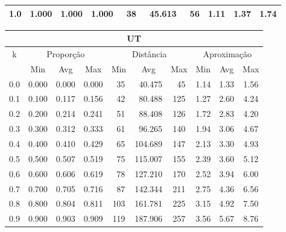 \begin{table}[!tbh]
\begin{center}
{\begin{tabular}{|c|c|c|c|c|c|c|c|c|c|}
1.0                & 1.000     & 1.000    & 1.000    & ~38      & ~45.613  & ~56     & 1.11    & 1.37  & 1.74             \\ \hline
\end{tabular}%
\vspace{5pt}
\begin{tabular}{|c|c|c|c|c|c|c|c|c|c|}
\hline
\multicolumn{10}{|c|}{\bf UT}                                                                                             \\ \hline
\multirow{2}{*}{k} & \multicolumn{3}{c|}{Proporção}  & \multicolumn{3}{c|}{Distância} & \multicolumn{3}{c|}{Aproximação}  \\ \cline{2-10}
                   & Min       & Avg      & Max      & Min      & Avg      & Max     & Min     & Avg   & Max              \\ \hline
0.0                & 0.000     & 0.000    & 0.000    & ~35      & ~40.475  & ~45     & 1.14    & 1.33  & 1.56             \\ \hline
0.1                & 0.100     & 0.117    & 0.156    & ~42      & ~80.488  & 125     & 1.27    & 2.60  & 4.24             \\ \hline
0.2                & 0.200     & 0.214    & 0.241    & ~51      & ~88.408  & 126     & 1.72    & 2.83  & 4.20             \\ \hline
0.3                & 0.300     & 0.312    & 0.333    & ~61      & ~96.265  & 140     & 1.94    & 3.06  & 4.67             \\ \hline
0.4                & 0.400     & 0.410    & 0.429    & ~65      & 104.689  & 147     & 2.13    & 3.30  & 4.93             \\ \hline
0.5                & 0.500     & 0.507    & 0.519    & ~75      & 115.007  & 155     & 2.39    & 3.60  & 5.12             \\ \hline
0.6                & 0.600     & 0.606    & 0.619    & ~78      & 127.210  & 170     & 2.52    & 3.94  & 6.00             \\ \hline
0.7                & 0.700     & 0.705    & 0.716    & ~87      & 142.344  & 211     & 2.75    & 4.36  & 6.56             \\ \hline
0.8                & 0.800     & 0.804    & 0.811    & 103      & 161.781  & 225     & 3.15    & 4.92  & 7.50             \\ \hline
0.9                & 0.900     & 0.903    & 0.909    & 119      & 187.906  & 257     & 3.56    & 5.67  & 8.76             \\ \hline

\end{tabular}}
\end{center}
\end{table}
